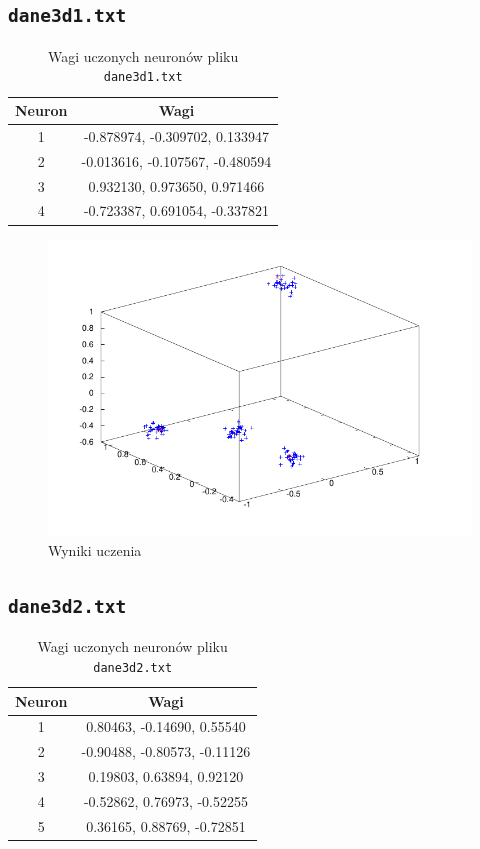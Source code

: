 \documentclass[pointlessnumbers, abstracton, headsepline, a4paper]{scrartcl}
\begin{document}
\clearpage
\subsection{\texttt{dane3d1.txt}}

\begin{table}[h]
\centering
\begin{tabular}[t]{c|c}
Neuron & Wagi \\
\hline
1&  -0.878974,  -0.309702,   0.133947 \\
2&  -0.013616,  -0.107567,  -0.480594 \\
3&   0.932130,   0.973650,   0.971466 \\
4&  -0.723387,   0.691054,  -0.337821 \\
\end{tabular}
\caption{\label{tab:xor}Wagi uczonych neuronów pliku \texttt{dane3d1.txt}}
\end{table}

\begin{figure}[!h]
\centering
\includegraphics[scale=1.0]{src/mydane3d1.pdf}\caption{\label{fig:dane1}Wyniki uczenia}
\end{figure}

\clearpage
\subsection{\texttt{dane3d2.txt}}

\begin{table}[h]
\centering
\begin{tabular}[t]{c|c}
Neuron & Wagi \\
\hline
1&   0.80463,  -0.14690,   0.55540 \\
2&  -0.90488,  -0.80573,  -0.11126 \\
3&   0.19803,   0.63894,   0.92120 \\
4&  -0.52862,   0.76973,  -0.52255 \\
5&   0.36165,   0.88769,  -0.72851 \\
\end{tabular}
\caption{\label{tab:xor}Wagi uczonych neuronów pliku \texttt{dane3d2.txt}}
\end{table}
\end{document}
